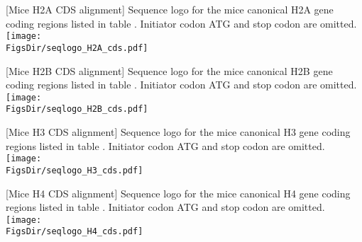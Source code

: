 
\newpage
\begin{center}
  [Mice H2A CDS alignment]{
    Sequence logo for the mice canonical H2A gene coding regions
    listed in table .
    Initiator codon ATG and stop codon are omitted.
  }
  \texttt{[image: \\FigsDir/seqlogo\_H2A\_cds.pdf]}
\end{center}
\newpage
\begin{center}
  [Mice H2B CDS alignment]{
    Sequence logo for the mice canonical H2B gene coding regions
    listed in table .
    Initiator codon ATG and stop codon are omitted.
  }
  \texttt{[image: \\FigsDir/seqlogo\_H2B\_cds.pdf]}
\end{center}
\newpage
\begin{center}
  [Mice H3 CDS alignment]{
    Sequence logo for the mice canonical H3 gene coding regions
    listed in table .
    Initiator codon ATG and stop codon are omitted.
  }
  \texttt{[image: \\FigsDir/seqlogo\_H3\_cds.pdf]}
\end{center}
\newpage
\begin{center}
  [Mice H4 CDS alignment]{
    Sequence logo for the mice canonical H4 gene coding regions
    listed in table .
    Initiator codon ATG and stop codon are omitted.
  }
  \texttt{[image: \\FigsDir/seqlogo\_H4\_cds.pdf]}
\end{center}


